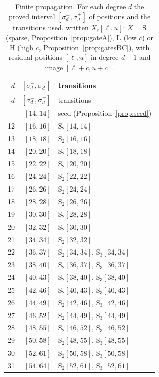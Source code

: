 \documentclass{amsart}
\theoremstyle{definition}
\theoremstyle{remark}
\numberwithin{equation}{section}
\begin{document}
{\small\begin{longtable}{rrp{}}
\caption{Finite propagation. For each degree $d$ the proved interval $[\sigma^-_d,\sigma^+_d]$ of positions and the transitions used, written $X_c[\ell,u]$: $X=\mathrm S$ (sparse, Proposition~\ref{prop:gateA}), $\mathrm L$ (low $c$) or $\mathrm H$ (high $c$, Proposition~\ref{prop:gatesBC}), with residual positions $[\ell,u]$ in degree $d-1$ and image $[\ell+c,u+c]$.}\label{tab:prop}\\
\toprule $d$&$[\sigma^-_d,\sigma^+_d]$&transitions\\\midrule\endfirsthead
\toprule $d$&$[\sigma^-_d,\sigma^+_d]$&transitions\\\midrule\endhead
\bottomrule\endfoot
11&$[14,14]$&seed (Proposition~\ref{prop:seed})\\
12&$[16,16]$&$\mathrm{S}_{2}[14,14]$\\
13&$[18,18]$&$\mathrm{S}_{2}[16,16]$\\
14&$[20,20]$&$\mathrm{S}_{2}[18,18]$\\
15&$[22,22]$&$\mathrm{S}_{2}[20,20]$\\
16&$[24,24]$&$\mathrm{S}_{2}[22,22]$\\
17&$[26,26]$&$\mathrm{S}_{2}[24,24]$\\
18&$[28,28]$&$\mathrm{S}_{2}[26,26]$\\
19&$[30,30]$&$\mathrm{S}_{2}[28,28]$\\
20&$[32,32]$&$\mathrm{S}_{2}[30,30]$\\
21&$[34,34]$&$\mathrm{S}_{2}[32,32]$\\
22&$[36,37]$&$\mathrm{S}_{2}[34,34]$, $\mathrm{S}_{3}[34,34]$\\
23&$[38,40]$&$\mathrm{S}_{2}[36,37]$, $\mathrm{S}_{3}[36,37]$\\
24&$[40,43]$&$\mathrm{S}_{2}[38,40]$, $\mathrm{S}_{3}[38,40]$\\
25&$[42,46]$&$\mathrm{S}_{2}[40,43]$, $\mathrm{S}_{3}[40,43]$\\
26&$[44,49]$&$\mathrm{S}_{2}[42,46]$, $\mathrm{S}_{3}[42,46]$\\
27&$[46,52]$&$\mathrm{S}_{2}[44,49]$, $\mathrm{S}_{3}[44,49]$\\
28&$[48,55]$&$\mathrm{S}_{2}[46,52]$, $\mathrm{S}_{3}[46,52]$\\
29&$[50,58]$&$\mathrm{S}_{2}[48,55]$, $\mathrm{S}_{3}[48,55]$\\
30&$[52,61]$&$\mathrm{S}_{2}[50,58]$, $\mathrm{S}_{3}[50,58]$\\
31&$[54,64]$&$\mathrm{S}_{2}[52,61]$, $\mathrm{S}_{3}[52,61]$\\

\end{longtable}}
\end{document}
